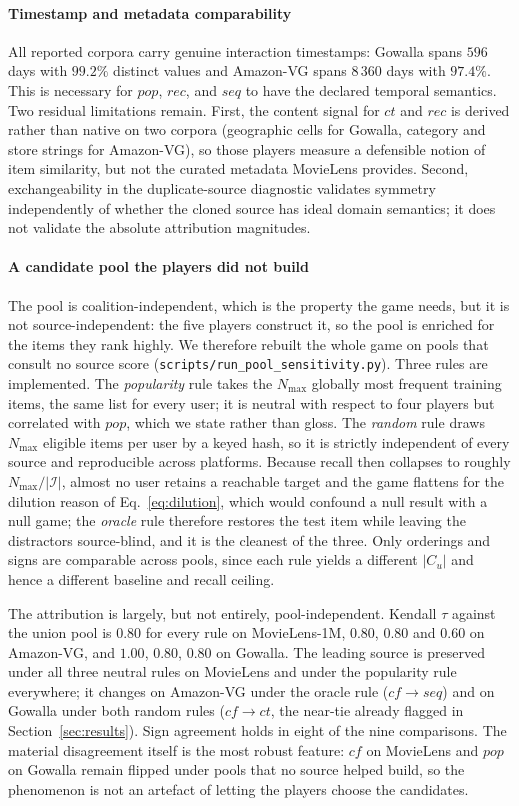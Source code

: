 \documentclass[pdflatex,sn-basic,Numbered]{sn-jnl}
\theoremstyle{plain}
\theoremstyle{definition}
\begin{document}
\paragraph{Timestamp and metadata comparability}
All reported corpora carry genuine interaction timestamps: Gowalla spans
$596$ days with $99.2\%$ distinct values and Amazon-VG spans $8\,360$ days
with $97.4\%$. This is necessary for $pop$, $rec$, and $seq$ to have the
declared temporal semantics. Two residual limitations remain. First, the content signal for $ct$ and $rec$
is derived rather than native on two corpora (geographic cells for Gowalla, category and store strings for Amazon-VG), so those players measure a
defensible notion of item similarity, but not the curated metadata MovieLens
provides. Second, exchangeability in the duplicate-source diagnostic validates
symmetry independently of whether the cloned source has ideal domain semantics;
it does not validate the absolute attribution magnitudes.

\paragraph{A candidate pool the players did not build}
The pool is coalition-independent, which is the property the game needs, but
it is not source-independent: the five players construct it, so the pool is
enriched for the items they rank highly. We therefore rebuilt the whole game
on pools that consult no source score
(\texttt{scripts/run\_pool\_sensitivity.py}). Three rules are implemented. The
\emph{popularity} rule takes the $N_{\max}$ globally most frequent training
items, the same list for every user; it is neutral with respect to four
players but correlated with $pop$, which we state rather than gloss. The
\emph{random} rule draws $N_{\max}$ eligible items per user by a keyed hash,
so it is strictly independent of every source and reproducible across
platforms. Because recall then collapses to roughly $N_{\max}/|\mathcal{I}|$,
almost no user retains a reachable target and the game flattens for the
dilution reason of Eq.~\eqref{eq:dilution}, which would confound a null result
with a null game; the \emph{oracle} rule therefore restores the test item
while leaving the distractors source-blind, and it is the cleanest of the
three. Only orderings and signs are comparable across pools, since each rule
yields a different $|C_u|$ and hence a different baseline and recall ceiling.

The attribution is largely, but not entirely, pool-independent. Kendall $\tau$
against the union pool is $0.80$ for every rule on MovieLens-1M, $0.80$,
$0.80$ and $0.60$ on Amazon-VG, and $1.00$, $0.80$, $0.80$ on Gowalla. The
leading source is preserved under all three neutral rules on MovieLens and
under the popularity rule everywhere; it changes on Amazon-VG under the oracle
rule ($cf \to seq$) and on Gowalla under both random rules ($cf \to ct$, the
near-tie already flagged in Section~\ref{sec:results}). Sign agreement holds
in eight of the nine comparisons. The material disagreement itself is the most
robust feature: $cf$ on MovieLens and $pop$ on Gowalla remain flipped under
pools that no source helped build, so the phenomenon is not an artefact of
letting the players choose the candidates.
\end{document}
